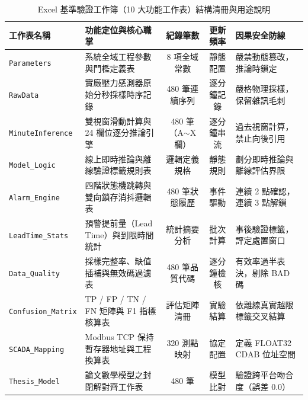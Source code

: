 \documentclass[fontset=none, a4paper, 12pt]{ctexart}
\begin{document}
\begin{table}[H]
    \centering
    \caption{Excel 基準驗證工作簿（10 大功能工作表）結構清冊與用途說明}
    \label{tab:excel_sheets}
    \footnotesize
    \begin{tabularx}{\textwidth}{llccl}
        \toprule
        \textbf{工作表名稱} & \textbf{功能定位與核心職掌} & \textbf{紀錄筆數} & \textbf{更新頻率} & \textbf{因果安全防線} \\
        \midrule
        \texttt{Parameters} & 系統全域工程參數與門檻定義表 & 8 項全域常數 & 靜態配置 & 嚴禁動態篡改，推論時鎖定 \\
        \texttt{RawData} & 實廠壓力感測器原始分秒採樣時序記錄 & 480 筆連續序列 & 逐分鐘記錄 & 嚴格物理採樣，保留雜訊毛刺 \\
        \texttt{MinuteInference} & 雙視窗滑動計算與 24 欄位逐分推論引擎 & 480 筆（A$\sim$X 欄） & 逐分鐘串流 & 過去視窗計算，禁止向後引用 \\
        \texttt{Model\_Logic} & 線上即時推論與離線驗證標籤規則表 & 邏輯定義規格 & 靜態規則 & 劃分即時推論與離線評估界限 \\
        \texttt{Alarm\_Engine} & 四階狀態機跳轉與雙向鎖存消抖邏輯表 & 480 筆狀態履歷 & 事件驅動 & 連續 2 點確認，連續 3 點解鎖 \\
        \texttt{LeadTime\_Stats} & 預警提前量（Lead Time）與到限時間統計 & 統計摘要分析 & 批次計算 & 事後驗證標籤，評定處置窗口 \\
        \texttt{Data\_Quality} & 採樣完整率、缺值插補與無效碼過濾表 & 480 筆品質代碼 & 逐分鐘檢核 & 有效率過半表決，剔除 BAD 碼 \\
        \texttt{Confusion\_Matrix} & TP / FP / TN / FN 矩陣與 F1 指標核算表 & 評估矩陣清冊 & 實驗結算 & 依離線真實越限標籤交叉結算 \\
        \texttt{SCADA\_Mapping} & Modbus TCP 保持暫存器地址與工程換算表 & 320 測點映射 & 協定配置 & 定義 FLOAT32 CDAB 位址空間 \\
        \texttt{Thesis\_Model} & 論文數學模型之封閉解對齊工作表 & 480 筆 & 模型比對 & 驗證跨平台吻合度（誤差 0.0） \\
        \bottomrule
    \end{tabularx}
\end{table}
\end{document}
